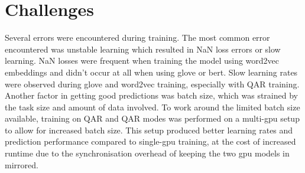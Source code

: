 \section{Challenges}
\label{sec:experiment-challenges}

Several errors were encountered during training.
The most common error encountered was unstable learning which resulted in NaN loss errors or slow learning.
NaN losses were frequent when training the model using word2vec embeddings and didn't occur at all when using glove or bert.
Slow learning rates were observed during glove and word2vec training, especially with Q\rightarrow{}AR training.
Another factor in getting good predictions was batch size, which was strained by the task size and amount of data involved.
To work around the limited batch size available, training on QA\rightarrow{}R and Q\rightarrow{}AR modes was performed on a multi-gpu setup to allow for increased batch size.
This setup produced better learning rates and prediction performance compared to single-gpu training, at the cost of increased runtime due to the synchronisation overhead of keeping the two gpu models in mirrored.

